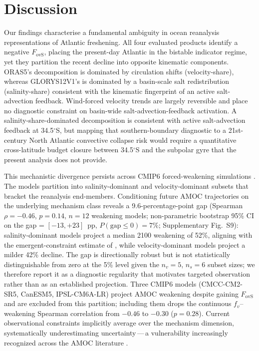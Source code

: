 \documentclass[11pt,a4paper]{article}
\begin{document}
\section*{Discussion}

Our findings characterise a fundamental ambiguity in ocean reanalysis representations of Atlantic freshening. All four evaluated products identify a negative \(F_{\mathrm{ovS}}\), placing the present-day Atlantic in the bistable indicator regime, yet they partition the recent decline into opposite kinematic components. ORAS5's decomposition is dominated by circulation shifts (velocity-share), whereas GLORYS12V1's is dominated by a basin-scale salt redistribution (salinity-share) consistent with the kinematic fingerprint of an active salt-advection feedback. Wind-forced velocity trends are largely reversible \citep{Chemke2021} and place no diagnostic constraint on basin-wide salt-advection-feedback activation. A salinity-share-dominated decomposition is consistent with active salt-advection feedback at 34.5$^\circ$S, but mapping that southern-boundary diagnostic to a 21st-century North Atlantic convective collapse risk would require a quantitative cross-latitude budget closure between 34.5$^\circ$S and the subpolar gyre that the present analysis does not provide.

This mechanistic divergence persists across CMIP6 forced-weakening simulations \citep{Sgubin2017, IPCC_AR6_Chapter9}. The models partition into salinity-dominant and velocity-dominant subsets that bracket the reanalysis end-members. Conditioning future AMOC trajectories on the underlying mechanism class reveals a 9.6-percentage-point gap (Spearman $\rho = -0.46$, $p = 0.14$, $n = 12$ weakening models; non-parametric bootstrap 95\% CI on the gap = $[-13, +23]$~pp, $P(\mathrm{gap}\leq 0) = 7\%$; Supplementary Fig.~S9): salinity-dominant models project a median 2100 weakening of 52\%, aligning with the emergent-constraint estimate of \citet{Portmann2026}, while velocity-dominant models project a milder 42\% decline. The gap is directionally robust but is not statistically distinguishable from zero at the 5\% level given the $n_v = 5$, $n_s = 6$ subset sizes; we therefore report it as a diagnostic regularity that motivates targeted observation rather than as an established projection. Three CMIP6 models (CMCC-CM2-SR5, CanESM5, IPSL-CM6A-LR) project AMOC weakening despite gaining $F_{\mathrm{ovS}}$ and are excluded from this partition; including them drops the continuous $f_v$--weakening Spearman correlation from $-0.46$ to $-0.30$ ($p = 0.28$). Current observational constraints implicitly average over the mechanism dimension, systematically underestimating uncertainty\,---\,a vulnerability increasingly recognized across the AMOC literature \citep{RahmstorfCaesar2026, Jackson2025}.
\end{document}
